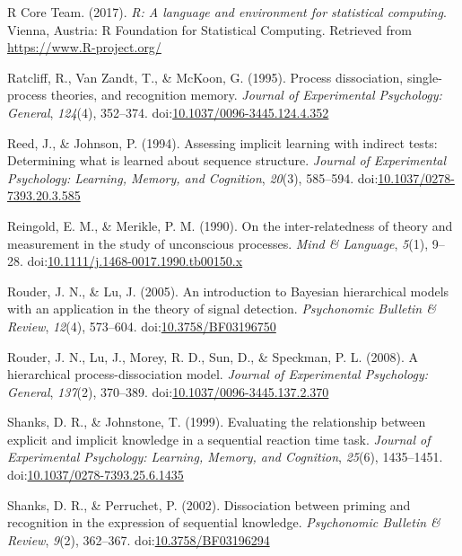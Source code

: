 \documentclass[man]{apa6}
\theoremstyle{definition}
\theoremstyle{definition}
\theoremstyle{definition}
\theoremstyle{remark}
\begin{document}
\hypertarget{ref-R-base}{}
R Core Team. (2017). \emph{R: A language and environment for statistical
computing}. Vienna, Austria: R Foundation for Statistical Computing.
Retrieved from \url{https://www.R-project.org/}

\hypertarget{ref-ratcliff_process_1995}{}
Ratcliff, R., Van Zandt, T., \& McKoon, G. (1995). Process dissociation,
single-process theories, and recognition memory. \emph{Journal of
Experimental Psychology: General}, \emph{124}(4), 352--374.
doi:\href{https://doi.org/10.1037/0096-3445.124.4.352}{10.1037/0096-3445.124.4.352}

\hypertarget{ref-reed_assessing_1994}{}
Reed, J., \& Johnson, P. (1994). Assessing implicit learning with
indirect tests: Determining what is learned about sequence structure.
\emph{Journal of Experimental Psychology: Learning, Memory, and
Cognition}, \emph{20}(3), 585--594.
doi:\href{https://doi.org/10.1037/0278-7393.20.3.585}{10.1037/0278-7393.20.3.585}

\hypertarget{ref-reingold_inter-relatedness_1990}{}
Reingold, E. M., \& Merikle, P. M. (1990). On the inter-relatedness of
theory and measurement in the study of unconscious processes. \emph{Mind
\& Language}, \emph{5}(1), 9--28.
doi:\href{https://doi.org/10.1111/j.1468-0017.1990.tb00150.x}{10.1111/j.1468-0017.1990.tb00150.x}

\hypertarget{ref-rouder_introduction_2005}{}
Rouder, J. N., \& Lu, J. (2005). An introduction to Bayesian
hierarchical models with an application in the theory of signal
detection. \emph{Psychonomic Bulletin \& Review}, \emph{12}(4),
573--604.
doi:\href{https://doi.org/10.3758/BF03196750}{10.3758/BF03196750}

\hypertarget{ref-rouder_hierarchical_2008}{}
Rouder, J. N., Lu, J., Morey, R. D., Sun, D., \& Speckman, P. L. (2008).
A hierarchical process-dissociation model. \emph{Journal of Experimental
Psychology: General}, \emph{137}(2), 370--389.
doi:\href{https://doi.org/10.1037/0096-3445.137.2.370}{10.1037/0096-3445.137.2.370}

\hypertarget{ref-shanks_evaluating_1999}{}
Shanks, D. R., \& Johnstone, T. (1999). Evaluating the relationship
between explicit and implicit knowledge in a sequential reaction time
task. \emph{Journal of Experimental Psychology: Learning, Memory, and
Cognition}, \emph{25}(6), 1435--1451.
doi:\href{https://doi.org/10.1037/0278-7393.25.6.1435}{10.1037/0278-7393.25.6.1435}

\hypertarget{ref-shanks_dissociation_2002}{}
Shanks, D. R., \& Perruchet, P. (2002). Dissociation between priming and
recognition in the expression of sequential knowledge. \emph{Psychonomic
Bulletin \& Review}, \emph{9}(2), 362--367.
doi:\href{https://doi.org/10.3758/BF03196294}{10.3758/BF03196294}
\end{document}
